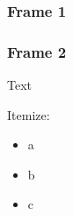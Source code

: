 \documentclass[t]{beamer}
\begin{document}
\begin{frame}
    \frametitle<1>{Frame 1}
    \frametitle<2>{Frame 2}
    Text\medskip\par
    Itemize:%
    \begin{itemize}
    \item a%
    \item b%
    \item c%
    \end{itemize}
    \begin{overlayarea}{300pt}{150pt}
      \begin{figure}
      \end{figure}
    \end{overlayarea}
\end{frame}
\end{document}
